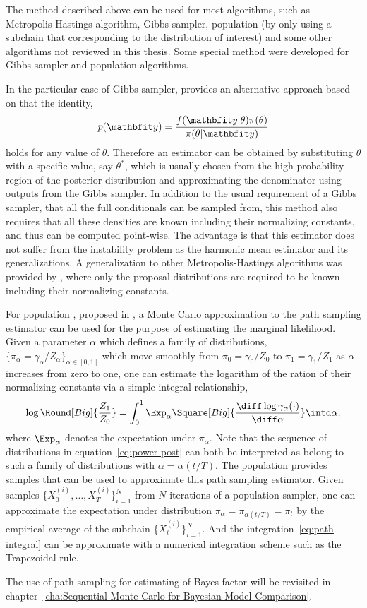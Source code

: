 The method described above can be used for most \mcmc algorithms, such as
Metropolis-Hastings algorithm, Gibbs sampler, population \mcmc (by only using
a subchain that corresponding to the distribution of interest) and some other
\mcmc algorithms not reviewed in this thesis. Some special method were
developed for Gibbs sampler and population \mcmc algorithms.

In the particular case of Gibbs sampler, \cite{Chib:1995em} provides an
alternative approach based on that the identity,
\begin{equation}
  p(\data) = \frac{f(\data|\theta)\pi(\theta)}{\pi(\theta|\data)}
\end{equation}
holds for any value of $\theta$. Therefore an estimator can be obtained by
substituting $\theta$ with a specific value, say $\theta^*$, which is usually
chosen from the high probability region of the posterior distribution and
approximating the denominator using outputs from the Gibbs sampler. In
addition to the usual requirement of a Gibbs sampler, that all the full
conditionals can be sampled from, this method also requires that all these
densities are known including their normalizing constants, and thus can be
computed point-wise. The advantage is that this estimator does not suffer from
the instability problem as the harmonic mean estimator and its
generalizations. A generalization to other Metropolis-Hastings algorithms was
provided by \cite{Chib:2001gq}, where only the proposal distributions are
required to be known including their normalizing constants.

For population \mcmc, proposed in \cite{Calderhead:2009bd}, a Monte Carlo
approximation to the path sampling estimator \cite{Gelman:1998ei} can be used
for the purpose of estimating the marginal likelihood. Given a parameter
$\alpha$ which defines a family of distributions, $\{\pi_{\alpha} =
\gamma_{\alpha}/Z_{\alpha}\}_{\alpha\in[0,1]}$ which move smoothly from $\pi_0
= \gamma_0/Z_0$ to $\pi_1 = \gamma_1/Z_1$ as $\alpha$ increases from zero to
one, one can estimate the logarithm of the ration of their normalizing
constants via a simple integral relationship,
\begin{equation}
  \log\Round[Big]{\frac{Z_1}{Z_0}} = \int_0^1\Exp_{\alpha}\Square[Big]{
    \frac{\diff\log\gamma_{\alpha}(\cdot)}{\diff\alpha}}\intd\alpha,
  \label{eq:path integral}
\end{equation}
where $\Exp_{\alpha}$ denotes the expectation under $\pi_{\alpha}$. Note that
the sequence of distributions in equation~\eqref{eq:power post} can both be
interpreted as belong to such a family of distributions with $\alpha =
\alpha(t/T)$. The population \mcmc provides samples that can be used to
approximate this path sampling estimator. Given samples
$\{X_0^{(i)},\dots,X_T^{(i)}\}_{i=1}^N$ from $N$ iterations of a population
\mcmc sampler, one can approximate the expectation under distribution
$\pi_{\alpha} = \pi_{\alpha(t/T)} = \pi_t$ by the empirical average of the
subchain $\{X_t^{(i)}\}_{i=1}^N$. And the integration~\eqref{eq:path integral}
can be approximate with a numerical integration scheme such as the Trapezoidal
rule.

The use of path sampling for estimating of Bayes factor will be revisited in
chapter~\ref{cha:Sequential Monte Carlo for Bayesian Model Comparison}.
